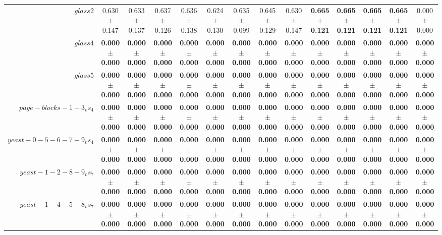 \begin{table}[!ht]
{\begin{tabular}{r c c c c c c c c c c c c c}
$glass2$ & 0.630 $\pm$ 0.147 & 0.633 $\pm$ 0.137 & 0.637 $\pm$ 0.126 & 0.636 $\pm$ 0.138 & 0.624 $\pm$ 0.130 & 0.635 $\pm$ 0.099 & 0.645 $\pm$ 0.129 & 0.630 $\pm$ 0.147 & \textbf{0.665 $\pm$ 0.121} & \textbf{0.665 $\pm$ 0.121} & \textbf{0.665 $\pm$ 0.121} & \textbf{0.665 $\pm$ 0.121} & 0.000 $\pm$ 0.000 \\
$glass4$ & \textbf{0.000 $\pm$ 0.000} & \textbf{0.000 $\pm$ 0.000} & \textbf{0.000 $\pm$ 0.000} & \textbf{0.000 $\pm$ 0.000} & \textbf{0.000 $\pm$ 0.000} & \textbf{0.000 $\pm$ 0.000} & \textbf{0.000 $\pm$ 0.000} & \textbf{0.000 $\pm$ 0.000} & \textbf{0.000 $\pm$ 0.000} & \textbf{0.000 $\pm$ 0.000} & \textbf{0.000 $\pm$ 0.000} & \textbf{0.000 $\pm$ 0.000} & \textbf{0.000 $\pm$ 0.000} \\
$glass5$ & \textbf{0.000 $\pm$ 0.000} & \textbf{0.000 $\pm$ 0.000} & \textbf{0.000 $\pm$ 0.000} & \textbf{0.000 $\pm$ 0.000} & \textbf{0.000 $\pm$ 0.000} & \textbf{0.000 $\pm$ 0.000} & \textbf{0.000 $\pm$ 0.000} & \textbf{0.000 $\pm$ 0.000} & \textbf{0.000 $\pm$ 0.000} & \textbf{0.000 $\pm$ 0.000} & \textbf{0.000 $\pm$ 0.000} & \textbf{0.000 $\pm$ 0.000} & \textbf{0.000 $\pm$ 0.000} \\
$page-blocks-1-3_vs_4$ & \textbf{0.000 $\pm$ 0.000} & \textbf{0.000 $\pm$ 0.000} & \textbf{0.000 $\pm$ 0.000} & \textbf{0.000 $\pm$ 0.000} & \textbf{0.000 $\pm$ 0.000} & \textbf{0.000 $\pm$ 0.000} & \textbf{0.000 $\pm$ 0.000} & \textbf{0.000 $\pm$ 0.000} & \textbf{0.000 $\pm$ 0.000} & \textbf{0.000 $\pm$ 0.000} & \textbf{0.000 $\pm$ 0.000} & \textbf{0.000 $\pm$ 0.000} & \textbf{0.000 $\pm$ 0.000} \\
$yeast-0-5-6-7-9_vs_4$ & \textbf{0.000 $\pm$ 0.000} & \textbf{0.000 $\pm$ 0.000} & \textbf{0.000 $\pm$ 0.000} & \textbf{0.000 $\pm$ 0.000} & \textbf{0.000 $\pm$ 0.000} & \textbf{0.000 $\pm$ 0.000} & \textbf{0.000 $\pm$ 0.000} & \textbf{0.000 $\pm$ 0.000} & \textbf{0.000 $\pm$ 0.000} & \textbf{0.000 $\pm$ 0.000} & \textbf{0.000 $\pm$ 0.000} & \textbf{0.000 $\pm$ 0.000} & \textbf{0.000 $\pm$ 0.000} \\
$yeast-1-2-8-9_vs_7$ & \textbf{0.000 $\pm$ 0.000} & \textbf{0.000 $\pm$ 0.000} & \textbf{0.000 $\pm$ 0.000} & \textbf{0.000 $\pm$ 0.000} & \textbf{0.000 $\pm$ 0.000} & \textbf{0.000 $\pm$ 0.000} & \textbf{0.000 $\pm$ 0.000} & \textbf{0.000 $\pm$ 0.000} & \textbf{0.000 $\pm$ 0.000} & \textbf{0.000 $\pm$ 0.000} & \textbf{0.000 $\pm$ 0.000} & \textbf{0.000 $\pm$ 0.000} & \textbf{0.000 $\pm$ 0.000} \\
$yeast-1-4-5-8_vs_7$ & \textbf{0.000 $\pm$ 0.000} & \textbf{0.000 $\pm$ 0.000} & \textbf{0.000 $\pm$ 0.000} & \textbf{0.000 $\pm$ 0.000} & \textbf{0.000 $\pm$ 0.000} & \textbf{0.000 $\pm$ 0.000} & \textbf{0.000 $\pm$ 0.000} & \textbf{0.000 $\pm$ 0.000} & \textbf{0.000 $\pm$ 0.000} & \textbf{0.000 $\pm$ 0.000} & \textbf{0.000 $\pm$ 0.000} & \textbf{0.000 $\pm$ 0.000} & \textbf{0.000 $\pm$ 0.000} \\

\end{tabular}}
\end{table}
